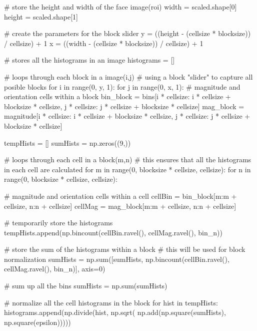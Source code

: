 \begin{pythoncode}
        # store the height and width of the face image(roi)
        width = scaled.shape[0]
        height = scaled.shape[1]

        # create the parameters for the block slider
        y = ((height - (cellsize * blocksize)) / cellsize) + 1
        x = ((width - (cellsize * blocksize)) / cellsize) + 1

        # stores all the histograms in an image
        histograms = []
		
        # loops through each block in a image(i,j)
        # using a block "slider" to capture all posible blocks 
        for i in range(0, y, 1):  
            for j in range(0, x, 1):
                # magnitude and orientation cells within a block
                bin_block = bins[i * cellsize: i * cellsize + blocksize * cellsize,
                            j * cellsize: j * cellsize + blocksize * cellsize]
                mag_block = magnitude[i * cellsize: i * cellsize + blocksize * cellsize,
                            j * cellsize: j * cellsize + blocksize * cellsize]
							
                tempHists = []
                sumHists = np.zeros((9,))
				
                # loops through each cell in a block(m,n)
                # this ensures that all the histograms in each cell are calculated
                for m in range(0, blocksize * cellsize, cellsize): 
                    for n in range(0, blocksize * cellsize, cellsize):
					
                        # magnitude and orientation cells within a cell
                        cellBin = bin_block[m:m + cellsize, n:n + cellsize]
                        cellMag = mag_block[m:m + cellsize, n:n + cellsize]
						
                        # temporarily store the histograms
                        tempHists.append(np.bincount(cellBin.ravel(), 
                        cellMag.ravel(), bin_n))
						
                        # store the sum of the histograms within a block
                        # this will be used for block normalization
                        sumHists = np.sum([sumHists, np.bincount(cellBin.ravel(), 
                        cellMag.ravel(), bin_n)], axis=0)
						
                # sum up all the bins
                sumHists = np.sum(sumHists)
				
                # normalize all the cell histograms in the block
                for hist in tempHists:
                    histograms.append(np.divide(hist, np.sqrt(
                    np.add(np.square(sumHists), np.square(epsilon)))))


\end{pythoncode}

